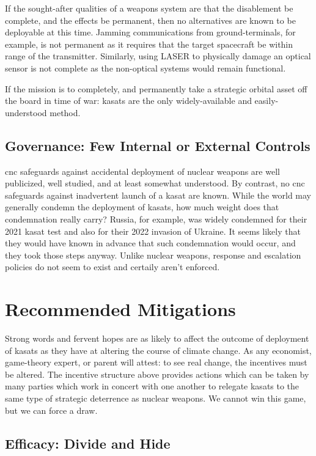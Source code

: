 If  the  sought-after qualities  of  a  weapons  system are  that  the
disablement  be  complete,  and  the effects  be  permanent,  then  no
alternatives  are  known  to  be deployable  at  this  time.   Jamming
communications from ground-terminals, for example, is not permanent as
it  requires  that  the  target  spacecraft be  within  range  of  the
transmitter.  Similarly,  using LASER to physically  damage an optical
sensor  is  not  complete  as the  non-optical  systems  would  remain
functional.

If the mission is to completely, and permanently take a strategic
orbital asset off the board in time of war: \acp{kasat} are the only
widely-available and easily-understood method.


\subsection*{Governance: Few Internal or External Controls}

\ac{cnc} safeguards against accidental deployment of nuclear weapons
are well publicized, well studied, and at least somewhat understood.
By contrast, no \ac{cnc} safeguards against inadvertent launch of a
\ac{kasat} are known.  While the world may generally condemn the
deployment of \acp{kasat}, how much weight does that condemnation
really carry?  Russia, for example, was widely condemned for their
2021 \ac{kasat} test and also for their 2022 invasion of Ukraine.  It
seems likely that they would have known in advance that such
condemnation would occur, and they took those steps anyway.  Unlike
nuclear weapons, response and escalation policies do not seem to
exist and certaily aren't enforced.


\section*{Recommended Mitigations}

Strong words and fervent hopes are as likely to affect the outcome of
deployment of \acp{kasat} as they have at altering the course of
climate change.  As any economist, game-theory expert, or parent will
attest: to see real change, the incentives must be altered.  The
incentive structure above provides actions which can be taken by many
parties which work in concert with one another to relegate \acp{kasat}
to the same type of strategic deterrence as nuclear weapons.  We
cannot win this game, but we can force a draw.


\subsection*{Efficacy: Divide and Hide}

